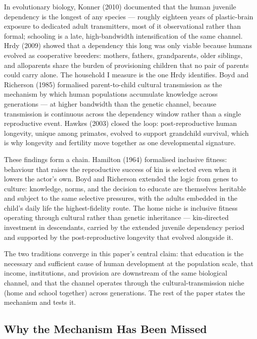 \documentclass[12pt,letterpaper]{article}
\begin{document}
In evolutionary biology, Konner (2010) documented that the human
juvenile dependency is the longest of any species --- roughly
eighteen years of plastic-brain exposure to dedicated adult
transmitters, most of it observational rather than formal; schooling
is a late, high-bandwidth intensification of the same channel. Hrdy
(2009) showed that a dependency this long was only viable because
humans evolved as cooperative breeders: mothers, fathers,
grandparents, older siblings, and alloparents share the burden of
provisioning children that no pair of parents could carry alone. The
household I measure is the one Hrdy identifies. Boyd and
Richerson (1985) formalised parent-to-child cultural transmission as
the mechanism by which human populations accumulate knowledge across
generations --- at higher bandwidth than the genetic channel, because
transmission is continuous across the dependency window rather than
a single reproductive event. Hawkes (2003) closed the loop:
post-reproductive human longevity, unique among primates, evolved to
support grandchild survival, which is why longevity and fertility
move together as one developmental signature.

These findings form a chain. Hamilton (1964) formalised inclusive
fitness: behaviour that raises the reproductive success of kin is
selected even when it lowers the actor's own. Boyd and Richerson
extended the logic from genes to culture: knowledge, norms, and the
decision to educate are themselves heritable and subject to the same
selective pressures, with the adults embedded in the child's daily
life the highest-fidelity route. The home niche is inclusive fitness
operating through cultural rather than genetic inheritance ---
kin-directed investment in descendants, carried by the extended
juvenile dependency period and supported by the post-reproductive
longevity that evolved alongside it.

The two traditions converge in this paper's central claim: that
education is the necessary and sufficient cause of human development
at the population scale, that income, institutions, and provision
are downstream of the same biological channel, and that the channel
operates through the cultural-transmission niche (home and school
together) across generations. The rest of the paper states the
mechanism and tests it.

\subsection{Why the Mechanism Has Been Missed}\label{why-the-mechanism-has-been-missed}
\end{document}
